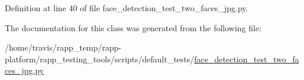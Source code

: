 Definition at line 40 of file face\-\_\-detection\-\_\-test\-\_\-two\-\_\-faces\-\_\-jpg.\-py.



The documentation for this class was generated from the following file\-:\begin{DoxyCompactItemize}
\item 
/home/travis/rapp\-\_\-temp/rapp-\/platform/rapp\-\_\-testing\-\_\-tools/scripts/default\-\_\-tests/\hyperlink{face__detection__test__two__faces__jpg_8py}{face\-\_\-detection\-\_\-test\-\_\-two\-\_\-faces\-\_\-jpg.\-py}\end{DoxyCompactItemize}
